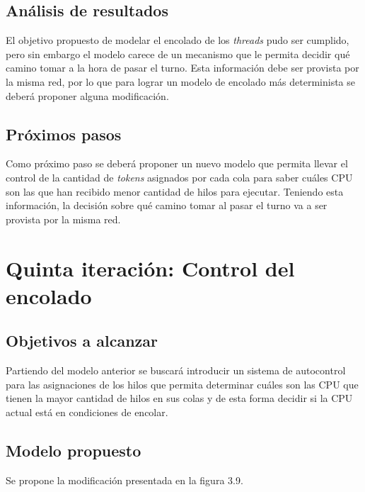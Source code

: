 \documentclass[a4paper]{book}
\begin{document}
\subsection{An\'alisis de resultados}
El objetivo propuesto de modelar el encolado de los \emph{threads} pudo ser cumplido, pero sin embargo el modelo carece de un mecanismo que le permita decidir qu\'e camino tomar a la hora de pasar el turno. Esta informaci\'on debe ser provista por la misma red, por lo que para lograr un modelo de encolado m\'as determinista se deber\'a proponer alguna modificaci\'on.

\subsection{Pr\'oximos pasos}
Como pr\'oximo paso se deber\'a proponer un nuevo modelo que permita llevar el control de la cantidad de \emph{tokens} asignados por cada cola para saber cu\'ales CPU son las que han recibido menor cantidad de hilos para ejecutar. Teniendo esta informaci\'on, la decisi\'on sobre qu\'e camino tomar al pasar el turno va a ser provista por la misma red.


\newpage
\section{Quinta iteraci\'on: Control del encolado}

\subsection{Objetivos a alcanzar}
Partiendo del modelo anterior se buscará introducir un sistema de autocontrol para las asignaciones de los hilos que permita determinar cu\'ales son las CPU que tienen la mayor cantidad de hilos en sus colas y de esta forma decidir si la CPU actual est\'a en condiciones de encolar.

\subsection{Modelo propuesto}
Se propone la modificación presentada en la figura 3.9.
\end{document}

